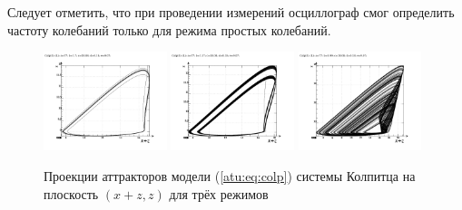 Следует отметить, что при проведении измерений осциллограф
смог определить частоту колебаний только для режима простых колебаний.


\begin{figure}[htb!]
 \centerline{
   \includegraphics[width=0.32\textwidth]{p/mod/colp_0-p_z_xpz_b=1x70.png}
   \includegraphics[width=0.32\textwidth]{p/mod/colp_0-p_z_xpz_b=1x37.png}
   \includegraphics[width=0.32\textwidth]{p/mod/colp_0-p_z_xpz_b=0x99.png}
 }
  \caption{Проекции аттракторов модели (\ref{atu:eq:colp}) системы Колпитца на плоскость $(x+z,z)$
  для трёх режимов}
  \label{atu:f:colp_model_xzz}
\end{figure}




